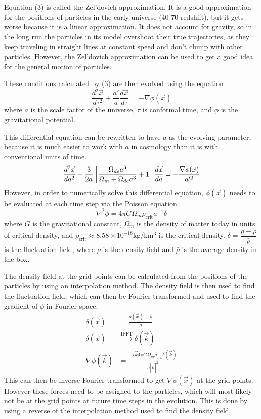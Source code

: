 \documentclass[12pt]{article}   	%
\newcommand\der[2]{\dfrac{d #1}{d #2}}
\begin{document}
Equation (3) is called the Zel'dovich approximation. It is a good approximation for the positions of
particles in the early universe (40-70 redshift), but it gets worse because it is a linear approximation.
It does not account for gravity, so in the long run the particles in its model overshoot their true
trajectories, as they keep traveling in straight lines at constant speed and don't clump with other
particles. However, the Zel'dovich approximation can be used to get a good idea for the general
motion of particles.

These conditions calculated by (3) are then evolved using the equation
\begin{equation}
	\der{^2\vec x}{\tau^2} + \frac{a'}{a}\der{\vec x}{\tau} = - \nabla\phi(\vec x)
\end{equation}
where $a$ is the scale factor of the universe, $\tau$ is conformal time, and $\phi$ is the gravitational
potential.

This differential equation can be rewritten to have $a$ as the evolving parameter, because it is
much easier to work with $a$ in cosmology than it is with conventional units of time.
\begin{equation}
	\der{^2\vec x}{a^2} + \frac{3}{2a}\left[\frac{\Omega_{de}a^3}
	{\Omega_m+\Omega_{de}a^3}+1\right]\der{\vec x}{a} =  -\frac{\nabla\phi(\vec x)}{a'^2}\\
\end{equation}
However, in order to numerically solve this differential equation, $\phi(\vec x)$ needs to be evaluated at
each time step via the Poisson equation
\begin{equation}
	\nabla^2\phi = 4\pi G\Omega_m\rho_{\text{crit}}a^{-1}\delta
\end{equation}
where $G$ is the gravitational constant, $\Omega_m$ is the density of matter today in units of critical
density, and $\rho_{\text{crit}}\approx 8.58\times 10^{-18}$kg/km$^3$ is the critical density. $\delta = 
\dfrac{\rho - \bar\rho}{\bar\rho}$ is the fluctuation field, where $\rho$ is the density field and $\bar\rho$ is 
the average density in the box.

The density field at the grid points can be calculated from the positions of the particles by using an
interpolation method. The density field is then used to find the fluctuation field, which can then be 
Fourier transformed  and used to find the gradient of $\phi$ in Fourier space:
\begin{align}
	\delta(\vec x) &= \frac{\rho(\vec x) - \bar\rho}{\bar\rho}\\
	\delta(\vec x) &\overset{\text{IFFT}}{\to} \delta(\vec k) \nonumber \\
	\nabla \phi(\vec k) &= \frac{-i\vec k4\pi G\Omega_m\rho_{\text{crit}}\delta(\vec k)}{a |\vec k|^2}
\end{align}
This can then be inverse Fourier transformed to get $\nabla\phi (\vec x)$ at the grid points. However 
these forces need to be assigned to the particles, which will most likely not be at the grid points at 
future time steps in the evolution. This is done by using a reverse of the interpolation method used
to find the density field.
\end{document}
